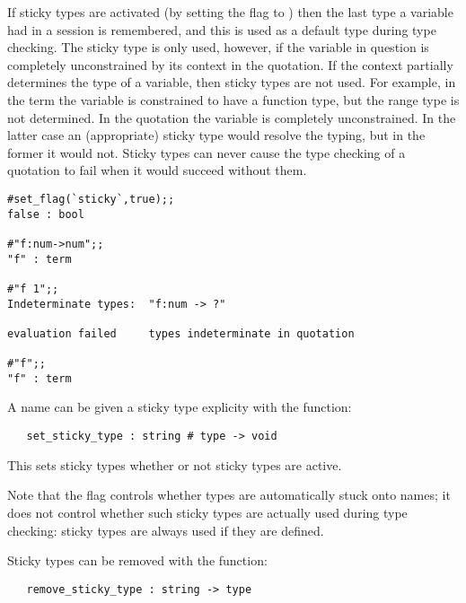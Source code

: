 \noindent If sticky types are  activated (by  setting the  flag  to
) then the last type a variable had in  a session  is remembered, and
this is used as a default type during type checking.   The sticky  type is only
used, however, if the variable in question is completely  unconstrained by its
context in the quotation.  If the context partially  determines the  type of a
variable, then sticky types are not used.  For example, in the term 
the variable  is constrained to have a function type, but the range type
is not  determined.    In  the quotation   the  variable  is
completely unconstrained.   In  the latter  case an  (appropriate) sticky type
would resolve the typing, but in the former  it would  not.   Sticky types can
never cause  the type checking  of a  quotation to  fail when  it would succeed
without them.

\setcounter{sessioncount}{1}
\begin{session}\begin{verbatim}
#set_flag(`sticky`,true);;
false : bool

#"f:num->num";;
"f" : term

#"f 1";;
Indeterminate types:  "f:num -> ?"

evaluation failed     types indeterminate in quotation

#"f";;
"f" : term
\end{verbatim}\end{session}

A name can be given a sticky type explicity with the function:

\begin{boxed}
\begin{verbatim}
   set_sticky_type : string # type -> void
\end{verbatim}\end{boxed}

\noindent  This sets sticky types whether or not sticky
types are active.

Note that the flag  controls whether types  are automatically stuck
onto names; it does not control  whether such  sticky types  are actually used
during type checking:  sticky types are always used if they are defined.

Sticky types can be removed with the function:

\begin{boxed}
\begin{verbatim}
   remove_sticky_type : string -> type
\end{verbatim}\end{boxed}


